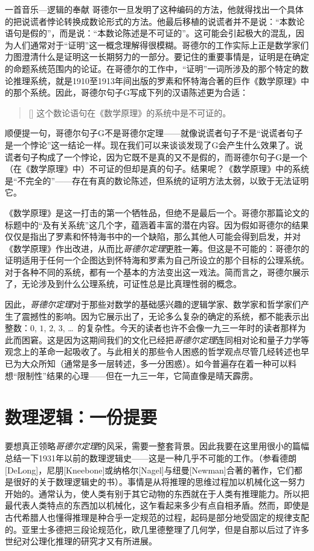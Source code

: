 \begin{intro}{一首音乐—逻辑的奉献}
哥德尔一旦发明了这种编码的方法，他就得找出一个具体的把说谎者悖论转换成数论形式的方法。他最后移植的说谎者并不是说：“本数论语句是假的”，而是说：“本数论陈述是不可证的”。这可能会引起极大的混乱，因为人们通常对于“证明”这一概念理解得很模糊。哥德尔的工作实际上正是数学家们力图澄清什么是证明这一长期努力的一部分。要记住的重要事情是，证明是在确定的命题系统范围内的论证。在哥德尔的工作中，“证明”一词所涉及的那个特定的数论推理系统，就是1910至1913年间出版的罗素和怀特海合著的巨作《数学原理》中的那个系统。因此，哥德尔句子G写成下列的汉语陈述更为合适：

\begin{quote}[]
这个数论语句在《数学原理》的系统中是不可证的。
\end{quote}
顺便提一句，哥德尔句子G不是哥德尔定理——就像说谎者句子不是“说谎者句子是一个悖论”这一结论一样。现在我们可以来谈谈发现了G会产生什么效果了。说谎者句子构成了一个悖论，因为它既不是真的又不是假的，而哥德尔句子G是一个（在《数学原理》中）不可证的但却是真的句子。结果呢？《数学原理》中的系统是“不完全的”——存在有真的数论陈述，但系统的证明方法太弱，以致于无法证明它。

《数学原理》是这一打击的第一个牺牲品，但绝不是最后一个。哥德尔那篇论文的标题中的“及有关系统”这几个字，蕴涵着丰富的潜在内容。因为假如哥德尔的结果仅仅是指出了罗素和怀特海书中的一个缺陷，那么其他人可能会得到启发，并对《数学原理》作出改进，从而比\emph{哥德尔定理}更胜一筹。但这是不可能的：哥德尔的证明适用于任何一个企图达到怀特海和罗素为自己所设立的那个目标的公理系统。对于各种不同的系统，都有一个基本的方法变出这一戏法。简而言之，哥德尔展示了，无论涉及到什么公理系统，可证性总是比真理性弱的概念。

因此，\emph{哥德尔定理}对于那些对数学的基础感兴趣的逻辑学家、数学家和哲学家们产生了震撼性的影响。因为它展示出了，无论多么复杂的确定的系统，都不能表示出整数：$0$, $1$, $2$, $3$, \ldots\ 的复杂性。今天的读者也许不会像一九三一年时的读者那样为此而困窘。这是因为这期间我们的文化已经把\emph{哥德尔定理}连同相对论和量子力学等观念上的革命一起吸收了。与此相关的那些令人困惑的哲学观点尽管几经转述也早已为大众所知（通常是多一层转述，多一分困惑）。如今普遍存在着一种可以料想“限制性”结果的心理——但在一九三一年，它简直像是晴天霹雳。

\section{数理逻辑：一份提要}

要想真正领略\emph{哥德尔定理}的风采，需要一整套背景。因此我要在这里用很小的篇幅总结一下1931年以前的数理逻辑史——这是一种几乎不可能的工作。（参看德朗[DeLong]，尼朋[Kneebone]或纳格尔[Nagel]与纽曼[Newman]合著的著作，它们都是很好的关于数理逻辑史的书）。事情是从将推理的思维过程加以机械化这一努力开始的。通常认为，使人类有别于其它动物的东西就在于人类有推理能力。所以把最代表人类特点的东西加以机械化，这乍看起来多少有点自相矛盾。然而，即使是古代希腊人也懂得推理是种合乎一定规范的过程，起码是部分地受固定的规律支配的。亚里士多德把三段论规范化，欧几里德整理了几何学，但是自那以后过了许多世纪对公理化推理的研究才又有所进展。


\end{intro}
